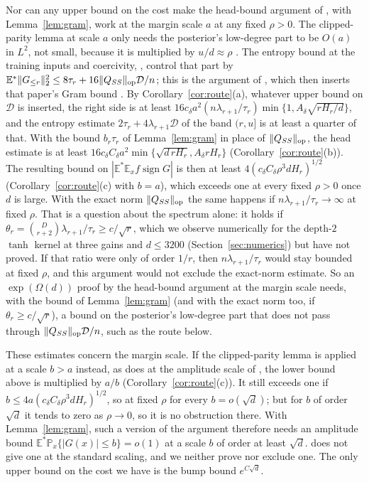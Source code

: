 \documentclass[11pt]{article}
\theoremstyle{definition}\newtheorem{assumption}[theorem]{Assumption}
\theoremstyle{remark}\newtheorem{remark}[theorem]{Remark}
\DeclareMathOperator{\sign}{sign}
\newcommand{\E}{\mathbb E}
\newcommand{\Pp}{\mathbb P}
\begin{document}
Nor can any upper bound on the cost make the head-bound argument of
\cite{subcritical}, with Lemma~\ref{lem:gram}, work at the margin scale
$a$ at any fixed $\rho>0$. The clipped-parity lemma at scale $a$ only needs
the posterior's low-degree part to be $O(a)$ in $L^2$, not small, because
it is multiplied by $u/d\approx\rho$ \cite[eq.~(24)]{subcritical}. The
entropy bound at the training inputs and coercivity,
\cite[eqs.~(41) and (43)]{subcritical}, control that part by
$\E^*\|G_{\le r}\|_2^2\le8\tau_r+16\|Q_{SS}\|_{\rm op}\mathcal D/n$; this is
the argument of \cite[eq.~(45)]{subcritical}, which then inserts that
paper's Gram bound \cite[eq.~(44)]{subcritical}. By
Corollary~\ref{cor:route}(a), whatever upper bound on $\mathcal D$ is
inserted, the right side is at least
$16c_\delta a^2(n\lambda_{r+1}/\tau_r)\min\{1,A_\delta\sqrt{rH_r/d}\}$, and
the entropy estimate $2\tau_r+4\lambda_{r+1}\mathcal D$ of the band $(r,u]$
is at least a quarter of that. With the bound $b_r\tau_r$ of
Lemma~\ref{lem:gram} in place of $\|Q_{SS}\|_{\rm op}$, the head estimate is
at least $16c_\delta C_\delta a^2\min\{\sqrt{d\,rH_r},A_\delta rH_r\}$
(Corollary~\ref{cor:route}(b)). The resulting bound on
$|\E^*\E_xf\sign G|$ is then at least $4(c_\delta C_\delta\rho^3dH_r)^{1/2}$
(Corollary~\ref{cor:route}(c) with $b=a$), which exceeds one at every fixed
$\rho>0$ once $d$ is large. With the exact norm $\|Q_{SS}\|_{\rm op}$ the
same happens if $n\lambda_{r+1}/\tau_r\to\infty$ at fixed $\rho$. That is a
question about the spectrum alone: it holds if
$\theta_r=\binom D{r+2}\lambda_{r+1}/\tau_r\ge c/\sqrt r$, which we observe
numerically for the depth-$2$ $\tanh$ kernel at three gains and $d\le3200$
(Section~\ref{sec:numerics}) but have not proved.
If that ratio were only of order $1/r$, then $n\lambda_{r+1}/\tau_r$ would
stay bounded at fixed $\rho$, and this argument would not exclude the
exact-norm estimate. So an $\exp(\Omega(d))$ proof by the head-bound
argument at the margin scale needs, with the bound of Lemma~\ref{lem:gram}
(and with the exact norm too, if $\theta_r\ge c/\sqrt r$), a bound on the
posterior's low-degree part that does not pass through
$\|Q_{SS}\|_{\rm op}\mathcal D/n$, such as the route below.

These estimates concern the margin scale. If the clipped-parity lemma is
applied at a scale $b>a$ instead, as \cite{subcritical} does at the
amplitude scale of \cite[Lemma~7.5]{subcritical}, the lower bound above is
multiplied by $a/b$ (Corollary~\ref{cor:route}(c)). It still exceeds one if
$b\le4a(c_\delta C_\delta\rho^3dH_r)^{1/2}$, so at fixed $\rho$ for every
$b=o(\sqrt d)$; but for $b$ of order $\sqrt d$ it tends to zero as
$\rho\to0$, so it is no obstruction there. With Lemma~\ref{lem:gram}, such
a version of the argument therefore needs an amplitude bound
$\E^*\Pp_x\{|G(x)|\le b\}=o(1)$ at a scale $b$ of order at least $\sqrt d$.
\cite[Lemma~7.5]{subcritical} does not give one at the standard scaling,
and we neither prove nor exclude one. The only upper bound on the cost we
have is the bump bound $e^{C\sqrt d}$.
\end{document}
